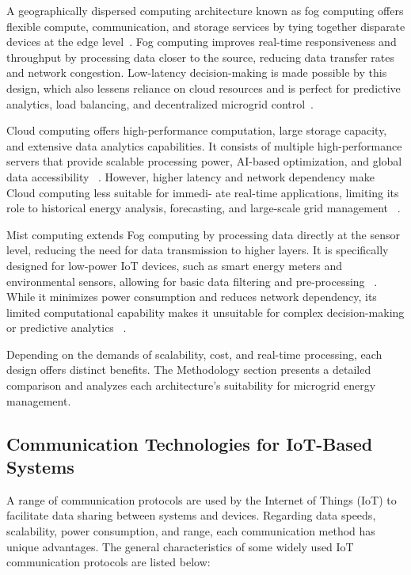 \documentclass[conference]{IEEEtran}
\begin{document}
A geographically dispersed computing architecture known as fog computing offers flexible compute, communication, and storage services by tying together disparate devices at the edge level~\cite{CloudFogMist2021}. Fog computing improves real-time responsiveness and throughput by processing data closer to the source, reducing data transfer rates and network congestion. Low-latency decision-making is made possible by this design, which also lessens reliance on cloud resources and is perfect for predictive analytics, load balancing, and decentralized microgrid control~\cite{CloudFogMist2021}.  

Cloud computing offers high-performance computation, large storage capacity, and extensive data analytics capabilities. It consists of multiple high-performance servers that provide scalable processing power, AI-based optimization, and global data accessibility ~\cite{CloudFogMist2021}. However, higher latency and network dependency make Cloud computing less suitable for immedi- ate real-time applications, limiting its role to historical energy analysis, forecasting, and large-scale grid management ~\cite{CloudFogMist2021}.  

Mist computing extends Fog computing by processing data directly at the sensor level, reducing the need for data transmission to higher layers. It is specifically designed for low-power IoT devices, such as smart energy meters and environmental sensors, allowing for basic data filtering and pre-processing ~\cite{CloudFogMist2021}. While it minimizes power consumption and reduces network dependency, its limited computational capability makes it unsuitable for complex decision-making or predictive analytics ~\cite{CloudFogMist2021}.   

Depending on the demands of scalability, cost, and real-time processing, each design offers distinct benefits. The Methodology section presents a detailed comparison and analyzes each architecture's suitability for microgrid energy management.


\subsection{Communication Technologies for IoT-Based Systems}

A range of communication protocols are used by the Internet of Things (IoT) to facilitate data sharing between systems and devices. Regarding data speeds, scalability, power consumption, and range, each communication method has unique advantages. The general characteristics of some widely used IoT communication protocols are listed below:
\end{document}
